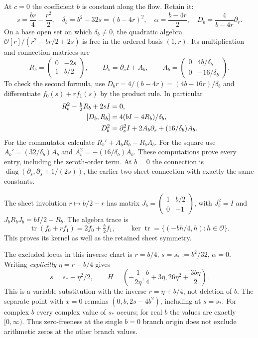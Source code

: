 At $c=0$ the coefficient $b$ is constant along the flow. Retain it:
\[
 s=\frac{br}{4}-\frac{r^2}{2},\quad
 \delta_b=b^2-32s=(b-4r)^2,\quad
 \alpha=\frac{b-4r}{2},\quad D_b=\frac4{b-4r}\partial_r.
\]
On a base open set on which $\delta_b\ne0$, the quadratic algebra
$\mathcal O[r]/(r^2-br/2+2s)$ is free in the ordered basis $(1,r)$.
Its multiplication and connection matrices are
\begin{equation}
 R_b=\begin{pmatrix}0&-2s\\1&b/2\end{pmatrix},\qquad
 D_b=\partial_s I+A_b,\qquad
 A_b=\begin{pmatrix}0&4b/\delta_b\\0&-16/\delta_b\end{pmatrix}.
 \label{eq:mag-connection-b}
\end{equation}
To check the second formula, use
$D_br=4/(b-4r)=(4b-16r)/\delta_b$ and differentiate
$f_0(s)+rf_1(s)$ by the product rule. In particular
\begin{align}
 R_b^2-\tfrac b2R_b+2sI&=0,\notag\\
 [D_b,R_b]&=4(bI-4R_b)/\delta_b,\notag\\
 D_b^2&=\partial_s^2 I+2A_b\partial_s+(16/\delta_b)A_b.
 \label{eq:mag-connection-b-square}
\end{align}
For the commutator calculate $R_b'+A_bR_b-R_bA_b$.
For the square use $A_b'=(32/\delta_b)A_b$ and
$A_b^2=-(16/\delta_b)A_b$. These computations prove every
entry, including the zeroth-order term. At $b=0$ the connection is
$\operatorname{diag}(\partial_s,\partial_s+1/(2s))$, the earlier
two-sheet connection with exactly the same constants.

The sheet involution $r\mapsto b/2-r$ has matrix
$J_b=\left(\begin{smallmatrix}1&b/2\\0&-1\end{smallmatrix}\right)$,
with $J_b^2=I$ and $J_bR_bJ_b=bI/2-R_b$.
The algebra trace is
\[
 \operatorname{tr}(f_0+rf_1)=2f_0+\tfrac b2 f_1,\qquad
 \ker\operatorname{tr}=\{(-bh/4,h):h\in\mathcal O\}.
\]
This proves its kernel as well as the retained sheet symmetry.

The excluded locus in this inverse chart is
$r=b/4$, $s=s_*:=b^2/32$, $\alpha=0$.
Writing \emph{explicitly} $\eta=r-b/4$ gives
\begin{equation}
 s=s_*-\eta^2/2,\qquad
 H=\left(-\frac1{2\eta},\frac b4+3\eta,
                  26\eta^2+\frac{3b\eta}{2}\right).
 \label{eq:mag-shifted-branch}
\end{equation}
This is a variable substitution with the inverse $r=\eta+b/4$,
not deletion of $b$. The separate point with $x=0$ remains
$(0,b,2s-4b^2)$, including at $s=s_*$. For complex $b$ every
complex value of $s_*$ occurs; for real $b$ the values are exactly
$[0,\infty)$. Thus zero-freeness at the single $b=0$ branch origin
does not exclude arithmetic zeros at the other branch values.

